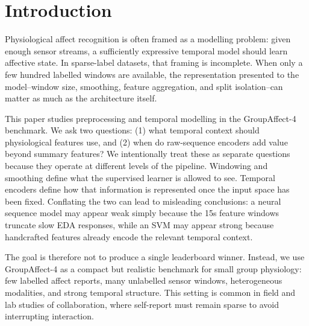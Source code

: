 \documentclass[sigconf,review,anonymous]{acmart}
\begin{document}


\maketitle

\section{Introduction}
\label{sec:intro}

Physiological affect recognition is often framed as a modelling problem:
given enough sensor streams, a sufficiently expressive temporal model should
learn affective state.
In sparse-label datasets, that framing is incomplete.
When only a few hundred labelled windows are available, the representation
presented to the model--window size, smoothing, feature aggregation, and split
isolation--can matter as much as the architecture itself.

This paper studies preprocessing and temporal modelling in the
GroupAffect-4 benchmark.
We ask two questions:
(1) what temporal context should physiological features use, and
(2) when do raw-sequence encoders add value beyond summary features?
We intentionally treat these as separate questions because they operate at
different levels of the pipeline.
Windowing and smoothing define what the supervised learner is allowed to see.
Temporal encoders define how that information is represented once the input
space has been fixed.
Conflating the two can lead to misleading conclusions: a neural sequence model
may appear weak simply because the 15s feature windows truncate slow EDA
responses, while an SVM may appear strong because handcrafted features already
encode the relevant temporal context.

The goal is therefore not to produce a single leaderboard winner.
Instead, we use GroupAffect-4 as a compact but realistic benchmark for small
group physiology: few labelled affect reports, many unlabelled sensor windows,
heterogeneous modalities, and strong temporal structure.
This setting is common in field and lab studies of collaboration, where
self-report must remain sparse to avoid interrupting interaction.
\end{document}
